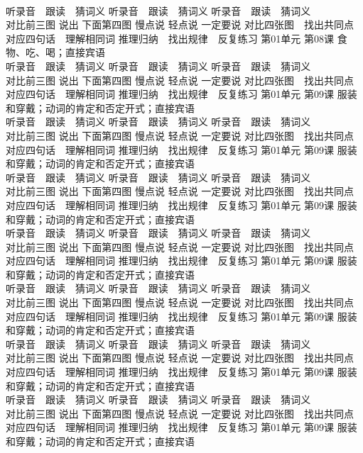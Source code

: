 \documentclass[8pt]{extreport}
\begin{document}
\begin{CJK}{UTF8}{min}
\\	听录音　跟读　猜词义 听录音　跟读　猜词义 听录音　跟读　猜词义 
\\	对比前三图 说出 下面第四图 慢点说 轻点说 一定要说	对比四张图　找出共同点 对应四句话　理解相同词 推理归纳　找出规律　反复练习 第01单元 第08课 食物、吃、喝；直接宾语
\\	听录音　跟读　猜词义 听录音　跟读　猜词义 听录音　跟读　猜词义 
\\	对比前三图 说出 下面第四图 慢点说 轻点说 一定要说	对比四张图　找出共同点 对应四句话　理解相同词 推理归纳　找出规律　反复练习 第01单元 第09课 服装和穿戴；动词的肯定和否定开式；直接宾语
\\	听录音　跟读　猜词义 听录音　跟读　猜词义 听录音　跟读　猜词义 
\\	对比前三图 说出 下面第四图 慢点说 轻点说 一定要说	对比四张图　找出共同点 对应四句话　理解相同词 推理归纳　找出规律　反复练习 第01单元 第09课 服装和穿戴；动词的肯定和否定开式；直接宾语
\\	听录音　跟读　猜词义 听录音　跟读　猜词义 听录音　跟读　猜词义 
\\	对比前三图 说出 下面第四图 慢点说 轻点说 一定要说	对比四张图　找出共同点 对应四句话　理解相同词 推理归纳　找出规律　反复练习 第01单元 第09课 服装和穿戴；动词的肯定和否定开式；直接宾语
\\	听录音　跟读　猜词义 听录音　跟读　猜词义 听录音　跟读　猜词义 
\\	对比前三图 说出 下面第四图 慢点说 轻点说 一定要说	对比四张图　找出共同点 对应四句话　理解相同词 推理归纳　找出规律　反复练习 第01单元 第09课 服装和穿戴；动词的肯定和否定开式；直接宾语
\\	听录音　跟读　猜词义 听录音　跟读　猜词义 听录音　跟读　猜词义 
\\	对比前三图 说出 下面第四图 慢点说 轻点说 一定要说	对比四张图　找出共同点 对应四句话　理解相同词 推理归纳　找出规律　反复练习 第01单元 第09课 服装和穿戴；动词的肯定和否定开式；直接宾语
\\	听录音　跟读　猜词义 听录音　跟读　猜词义 听录音　跟读　猜词义 
\\	对比前三图 说出 下面第四图 慢点说 轻点说 一定要说	对比四张图　找出共同点 对应四句话　理解相同词 推理归纳　找出规律　反复练习 第01单元 第09课 服装和穿戴；动词的肯定和否定开式；直接宾语
\\	听录音　跟读　猜词义 听录音　跟读　猜词义 听录音　跟读　猜词义 
\\	对比前三图 说出 下面第四图 慢点说 轻点说 一定要说	对比四张图　找出共同点 对应四句话　理解相同词 推理归纳　找出规律　反复练习 第01单元 第09课 服装和穿戴；动词的肯定和否定开式；直接宾语

\end{CJK}
\end{document}
